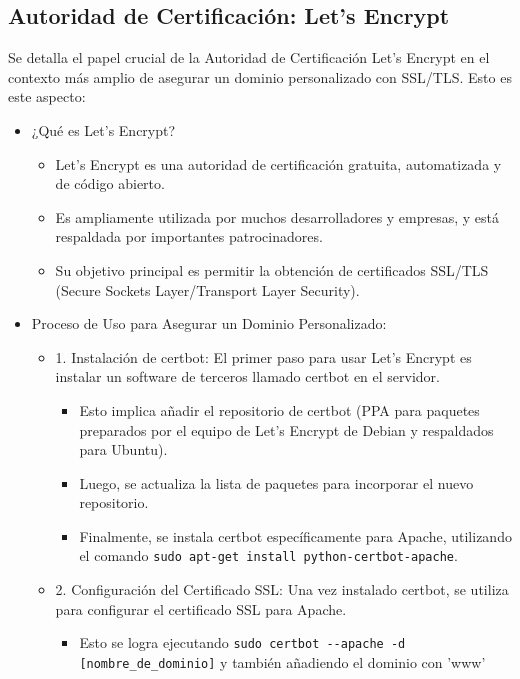 \documentclass{report}
\begin{document}
\subsection{Autoridad de Certificación: Let's Encrypt}
Se detalla el papel crucial de la Autoridad de Certificación Let's Encrypt en el contexto más amplio 
de asegurar un dominio personalizado con SSL/TLS.
Esto es este aspecto:
\begin{itemize}
    \item ¿Qué es Let's Encrypt?
        \begin{itemize}
            \item Let's Encrypt es una autoridad de certificación gratuita, automatizada y de código abierto.
            \item Es ampliamente utilizada por muchos desarrolladores y empresas, y está respaldada por importantes patrocinadores.
            \item Su objetivo principal es permitir la obtención de certificados SSL/TLS (Secure Sockets Layer/Transport Layer Security).
        \end{itemize}
    \item Proceso de Uso para Asegurar un Dominio Personalizado:
        \begin{itemize}
            \item 1. Instalación de certbot: El primer paso para usar Let's Encrypt es instalar un software de terceros llamado certbot en el servidor.
                \begin{itemize}
                    \item Esto implica añadir el repositorio de certbot (PPA para paquetes preparados por el equipo de Let's Encrypt de 
                    Debian y respaldados para Ubuntu).
                    \item Luego, se actualiza la lista de paquetes para incorporar el nuevo repositorio.
                    \item Finalmente, se instala certbot específicamente para Apache, utilizando el comando \verb|sudo apt-get install python-certbot-apache|.
                \end{itemize}
            \item 2. Configuración del Certificado SSL: Una vez instalado certbot, se utiliza para configurar el certificado SSL para Apache.
                \begin{itemize}
                    \item Esto se logra ejecutando \verb|sudo certbot --apache -d [nombre_de_dominio]| y también añadiendo el dominio con 'www' 

\end{itemize}
\end{itemize}
\end{itemize}
\end{document}
